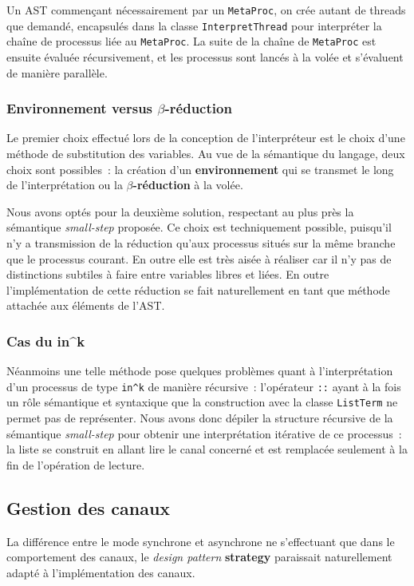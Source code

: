 \documentclass[11pt]{article} %
\begin{document}
Un AST commençant nécessairement par un \texttt{MetaProc}, on crée autant de threads que demandé, encapsulés dans la classe \texttt{InterpretThread} pour interpréter la chaîne de processus liée au \texttt{MetaProc}. La suite de la chaîne de \texttt{MetaProc} est ensuite évaluée récursivement, et les processus sont lancés à la volée et s'évaluent de manière parallèle.
\subsubsection{Environnement versus $\beta$-réduction}
Le premier choix effectué lors de la conception de l'interpréteur est le choix d'une méthode de substitution des variables. Au vue de la sémantique du langage, deux choix sont possibles~: la création d'un \textbf{environnement} qui se transmet le long de l'interprétation ou la  \textbf{$\beta$-réduction} à la volée.

Nous avons optés pour la deuxième solution, respectant au plus près la sémantique \emph{small-step} proposée.  Ce choix est techniquement possible, puisqu'il n'y a transmission de la réduction qu'aux processus situés sur la même branche que le processus courant. En outre elle est très aisée à réaliser car il n'y pas de distinctions subtiles à faire entre variables libres et liées. En outre l'implémentation de cette réduction se fait naturellement en tant que méthode attachée aux éléments de l'AST.

\subsubsection{Cas du in\^{}k}
Néanmoins une telle méthode pose quelques problèmes quant à l'interprétation d'un processus de type \texttt{in\^{}k} de manière récursive~: l'opérateur \texttt{::} ayant à la fois un rôle sémantique et syntaxique que la construction avec la classe \texttt{ListTerm} ne permet pas de représenter. Nous avons donc dépiler la structure récursive de la sémantique \emph{small-step} pour obtenir une interprétation itérative de ce processus~: la liste se construit en allant lire le canal concerné et est remplacée seulement à la fin de l'opération de lecture.

\subsection{Gestion des canaux}

La différence entre le mode synchrone et asynchrone ne s'effectuant que dans le comportement des canaux, le \emph{design pattern} \textbf{strategy} paraissait naturellement adapté à l'implémentation des canaux.
\end{document}
